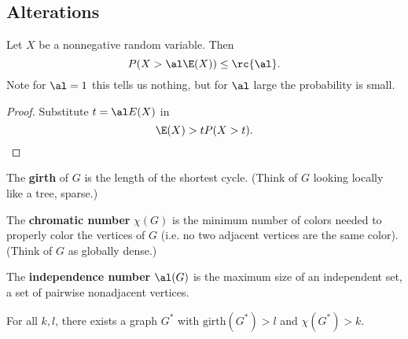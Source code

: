\subsection{Alterations}
\begin{thm}
Let $X$ be a nonnegative random variable. Then
\[
P(X>\al\E(X))\leq \rc{\al}.
\]
Note for $\al=1$ this tells us nothing, but for $\al$ large the probability is small.
\end{thm}
\begin{proof}
Substitute $t=\al E(X)$ in
\[
\E(X)>tP(X>t).
\]
\end{proof}
\begin{df}
The \textbf{girth} of $G$ is the length of the shortest cycle. (Think of $G$ looking locally like a tree, sparse.)

The \textbf{chromatic number} $\chi(G)$ is the minimum number of colors needed to properly color the vertices of $G$ (i.e. no two adjacent vertices are the same color). (Think of $G$ as globally dense.)

The \textbf{independence number} $\al(G)$ is the maximum size of an independent set, a set of pairwise nonadjacent vertices.
\end{df}
\begin{thm}[Erd\"os]
For all $k,l$, there exists a graph $G^*$ with $\text{girth}(G^*)>l$ and $\chi(G^*)>k$.
\end{thm}

